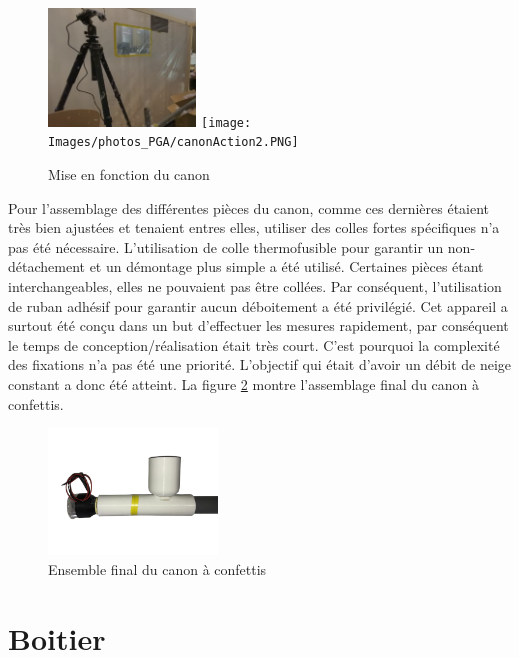 \begin{figure}[H]
    \centering
    \includegraphics[width=0.35\textwidth]{Images/photos_PGA/canonAction1.PNG}
    \texttt{[image: Images/photos\_PGA/canonAction2.PNG]}
    \caption{Mise en fonction du canon}
    \label{fig:canonupdate}
\end{figure}

Pour l’assemblage des différentes pièces du canon, comme ces dernières étaient très bien ajustées et 
tenaient entres elles, utiliser des colles fortes spécifiques n’a pas été nécessaire. 
L’utilisation de colle thermofusible pour garantir un non-détachement et un démontage plus simple a été utilisé. 
Certaines pièces étant interchangeables, elles ne pouvaient pas être collées. Par conséquent, l’utilisation de ruban adhésif pour 
garantir aucun déboitement a été privilégié. Cet appareil a surtout été conçu dans un but d'effectuer 
les mesures rapidement, par conséquent le temps de conception/réalisation était très court. C’est pourquoi la complexité 
des fixations n’a pas été une priorité. L’objectif qui était d’avoir un débit de neige constant a donc 
été atteint. La figure \ref{fig:canonensemble} montre l'assemblage final du canon à confettis.

\begin{figure}[H]
    \centering
    \includegraphics[width=0.4\textwidth]{Images/photos_PGA/canonComplpetv2-removebg-preview.png}
    \caption{Ensemble final du canon à confettis}
    \label{fig:canonensemble}
\end{figure}

\newpage
\section{Boitier}

